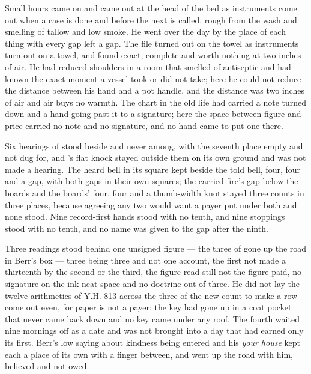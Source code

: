 \scenebreak

Small hours came on and  came out at the head of the bed as instruments come out when a case is done and before the next is called, rough from the wash and smelling of tallow and low smoke. He went over the day by the place of each thing with every gap left a gap. The file turned out on the towel as instruments turn out on a towel, and found exact, complete and worth nothing at two inches of air. He had reduced shoulders in a room that smelled of antiseptic and had known the exact moment a vessel took or did not take; here he could not reduce the distance between his hand and a pot handle, and the distance was two inches of air and air buys no warmth. The chart in the old life had carried a note turned down and a hand going past it to a signature; here the space between figure and price carried no note and no signature, and no hand came to put one there.

Six hearings of  stood beside and never among, with the seventh place empty and not dug for, and 's flat knock stayed outside them on its own ground and was not made a hearing. The heard bell in its square kept beside the told bell, four, four and a gap, with both gaps in their own squares; the carried fire's gap below the boards and the boards' four, four and a thumb-width knot stayed three counts in three places, because agreeing any two would want a payer put under both and none stood. Nine record-first hands stood with no tenth, and nine stoppings stood with no tenth, and no name was given to the gap after the ninth.

Three readings stood behind one unsigned figure --- the three of  gone up the road in Berr's box --- three being three and not one account, the first not made a thirteenth by the second or the third, the figure read still not the figure paid, no signature on the ink-neat space and no doctrine out of three. He did not lay the twelve arithmetics of Y.H. 813 across the three of the new count to make a row come out even, for paper is not a payer; the key had gone up in a coat pocket that never came back down and no key came under any roof. The fourth waited nine mornings off as a date and was not brought into a day that had earned only its first. Berr's low saying about kindness being entered and his \emph{your house} kept each a place of its own with a finger between, and went up the road with him, believed and not owed.

